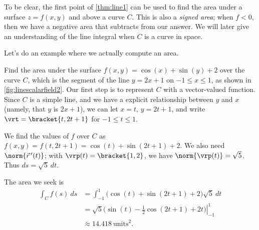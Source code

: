 
To be clear, the first point of \autoref{thm:line1} can be used to find the area under a surface $z=f(x,y)$ and above a curve $C$. This is also a \emph{signed area}; when $f<0$, then we have a negative area that subtracts from our answer.  We will later give an understanding of the line integral when $C$ is a curve in space.


Let's do an example where we actually compute an area.


\begin{example}\label{ex_linescalarfield2}
Find the area under the surface $f(x,y) =\cos(x)+\sin(y)+2$ over the curve $C$, which is the segment of the line $y=2x+1$ on $-1\leq x\leq 1$, as shown in \autoref{fig:linescalarfield2}.
\solution
Our first step is to represent $C$ with a vector-valued function. Since $C$ is a simple line, and we have a explicit relationship between $y$ and $x$ (namely, that $y$ is $2x+1$), we can let $x = t$, $y = 2t+1$, and write $\vrt =\bracket{t,2t+1}$ for $-1\leq t\leq 1$. 

We find the values of $f$ over $C$ as $f(x,y) = f(t,2t+1) = \cos(t)+\sin(2t+1) + 2$. We also need $\norm{\vec r\,'(t)}$; with $\vrp(t) =\bracket{1,2}$, we have $\norm{\vrp(t)} = \sqrt{5}$. Thus $ds = \sqrt{5}\ dt$. 

The area we seek is 
\begin{align*}
	\int_Cf(s)\ ds
	&= \int_{-1}^1 \bigl(\cos(t)+\sin(2t+1) + 2\bigr)\sqrt{5}\ dt \\
	&= \left.\sqrt{5}\bigl(\sin(t) - \frac12\cos(2t+1)+2t\bigr)\right|_{-1}^1\\
	&\approx 14.418\ \text{units}^2.
\end{align*}
\end{example}

